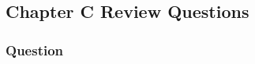 \documentclass[../../../main.tex]{subfiles}
\begin{document}
\subsection{Chapter C Review Questions}
\subsubsection{Question} 
\end{document}
